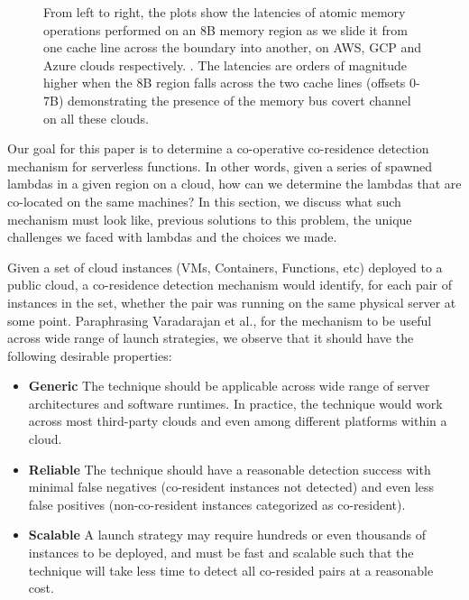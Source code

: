 \begin{figure}[h!]
\begin{subfigure}{.33\textwidth}
\end{subfigure}
\caption{From left to right, the plots show the latencies of atomic 
      memory operations performed on an 8B memory region as we slide it 
      from one cache line across the boundary into another, on AWS, GCP and 
      Azure clouds respectively. . The latencies 
      are orders of magnitude higher when the 8B region falls across the 
      two cache lines (offsets 0-7B) demonstrating the presence of 
      the memory bus covert channel on all these clouds. \label{fig:membus_clouds}}
\label{fig:fig}
\end{figure}

Our goal for this paper is to determine a co-operative co-residence detection mechanism for 
serverless functions. In other words, given a series of spawned lambdas in a given region 
on a cloud, how can we determine the lambdas that are co-located on the same machines?
In this section, we discuss what such mechanism must look like, previous solutions to 
this problem, the unique challenges we faced with lambdas and the choices we made. 

Given a set of cloud instances (VMs, Containers, Functions, etc) deployed
to a public cloud, a co-residence detection mechanism would identify, for each 
pair of instances in the set, whether the pair was running on the same physical 
server at some point. Paraphrasing Varadarajan et al.\cite{varadarajan2015}, for 
the mechanism to be useful across wide range of 
launch strategies, we observe that it should have the following desirable 
properties:

\begin{itemize}
    \item \textbf{Generic} The technique should be applicable across wide 
    range of server architectures and software runtimes. In practice, the technique 
    would work across most third-party clouds and 
    even among different platforms within a cloud.
    \item \textbf{Reliable} The technique should have a reasonable detection success
    with minimal false negatives (co-resident instances not detected) and even 
    less false positives (non-co-resident instances categorized as co-resident).
    \item \textbf{Scalable} A launch strategy may require hundreds or even thousands 
    of instances to be deployed, and must be fast and scalable such that the 
    technique will take less time to detect all co-resided pairs at a reasonable cost.
\end{itemize}

